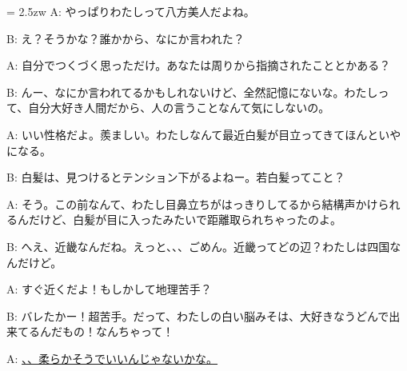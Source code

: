 \documentclass[11pt]{amsart}
\title{}
\author{}
\newenvironment{hangall}[1]{\hangindent = 2.5zw\everypar{\hangindent = 2.5zw}}{}
\begin{document}
\maketitle
\begin{hangall}{}%
A: やっぱりわたしって八方美人だよね。

B: え？そうかな？誰かから、なにか言われた？

A: 自分でつくづく思っただけ。あなたは周りから指摘されたこととかある？

B: んー、なにか言われてるかもしれないけど、全然記憶にないな。わたしって、自分大好き人間だから、人の言うことなんて気にしないの。

A: いい性格だよ。羨ましい。わたしなんて最近白髪が目立ってきてほんといやになる。

B: 白髪は、見つけるとテンション下がるよねー。若白髪ってこと？

A: そう。この前なんて、わたし目鼻立ちがはっきりしてるから結構声かけられるんだけど、白髪が目に入ったみたいで距離取られちゃったのよ。

B: へえ、近畿なんだね。えっと、、、ごめん。近畿ってどの辺？わたしは四国なんだけど。

A: すぐ近くだよ！もしかして地理苦手？

B: バレたかー！超苦手。だって、わたしの白い脳みそは、大好きなうどんで出来てるんだもの！なんちゃって！

A: \ul{、、柔らかそうでいいんじゃないかな。}\end{hangall}
\end{document}
